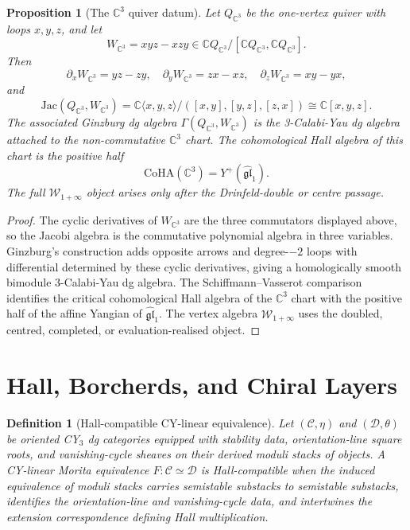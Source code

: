 \documentclass[11pt]{amsart}
\newtheorem{proposition}[theorem]{Proposition}
\newtheorem{definition}[theorem]{Definition}
\newcommand{\CoHA}{\mathrm{CoHA}}
\newcommand{\Jac}{\mathrm{Jac}}
\newcommand{\cC}{\mathcal{C}}
\newcommand{\cD}{\mathcal{D}}
\newcommand{\bC}{\mathbb{C}}
\begin{document}
\begin{proposition}[The $\bC^3$ quiver datum]
\label{prop:c3-ginzburg-datum}
Let $Q_{\bC^3}$ be the one-vertex quiver with loops $x,y,z$, and let
\[
  W_{\bC^3}=xyz-xzy\in \bC Q_{\bC^3}/[\bC Q_{\bC^3},\bC Q_{\bC^3}].
\]
Then
\[
  \partial_x W_{\bC^3}=yz-zy,\quad
  \partial_y W_{\bC^3}=zx-xz,\quad
  \partial_z W_{\bC^3}=xy-yx,
\]
and
\[
  \Jac(Q_{\bC^3},W_{\bC^3})
  =
  \bC\langle x,y,z\rangle/([x,y],[y,z],[z,x])
  \cong \bC[x,y,z].
\]
The associated Ginzburg dg algebra $\Gamma(Q_{\bC^3},W_{\bC^3})$ is the
3-Calabi-Yau dg algebra attached to the non-commutative $\bC^3$ chart.
The cohomological Hall algebra of this chart is the positive half
\[
  \CoHA(\bC^3)=Y^+(\widehat{\mathfrak{gl}}_1).
\]
The full $\mathcal W_{1+\infty}$ object arises only after the
Drinfeld-double or centre passage.
\end{proposition}

\begin{proof}
The cyclic derivatives of $W_{\bC^3}$ are the three commutators
displayed above, so the Jacobi algebra is the commutative polynomial
algebra in three variables.  Ginzburg's construction adds opposite
arrows and degree-$-2$ loops with differential determined by these
cyclic derivatives, giving a homologically smooth bimodule
$3$-Calabi-Yau dg algebra.  The Schiffmann--Vasserot comparison
identifies the critical cohomological Hall algebra of the
$\bC^3$ chart with the positive half of the affine Yangian of
$\widehat{\mathfrak{gl}}_1$.  The vertex algebra
$\mathcal W_{1+\infty}$ uses the doubled, centred, completed, or
evaluation-realised object.
\end{proof}

\section{Hall, Borcherds, and Chiral Layers}

\begin{definition}[Hall-compatible CY-linear equivalence]
Let $(\cC,\eta)$ and $(\cD,\theta)$ be oriented CY$_3$ dg categories
equipped with stability data, orientation-line square roots, and
vanishing-cycle sheaves on their derived moduli stacks of objects.  A
CY-linear Morita equivalence $F\colon\cC\simeq\cD$ is
Hall-compatible when the induced equivalence of moduli stacks carries
semistable substacks to semistable substacks, identifies the
orientation-line and vanishing-cycle data, and intertwines the
extension correspondence defining Hall multiplication.
\end{definition}
\end{document}
